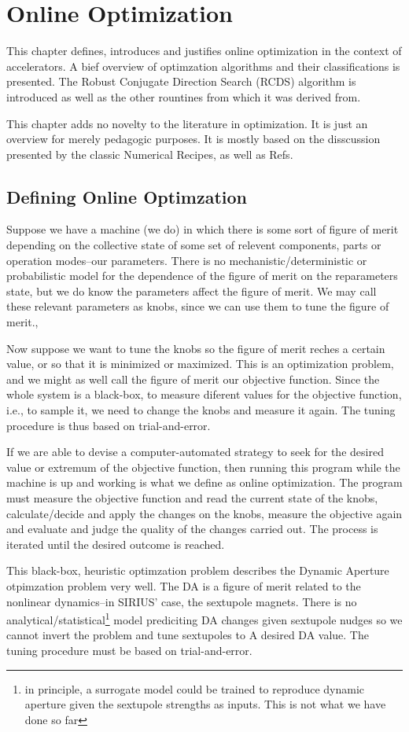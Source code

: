 \chapter{Online Optimization}
This chapter defines, introduces and justifies online optimization in the context of accelerators. A bief overview of optimzation algorithms and their classifications is presented. The Robust Conjugate Direction Search (RCDS) algorithm is introduced as well as the other rountines from which it was derived from.

This chapter adds no novelty to the literature in optimization. It is just an overview for merely pedagogic purposes. It is mostly based on the disscussion presented by the classic Numerical Recipes, as well as Refs.
\section{Defining Online Optimzation}
Suppose we have a machine (we do) in which there is some sort of figure of merit depending on the collective state of some set of relevent components, parts or operation modes--our parameters. There is no mechanistic/deterministic or probabilistic model for the dependence of the figure of merit on the reparameters state, but we do know the parameters affect the figure of merit. We may call these relevant parameters as knobs, since we can use them to tune the figure of merit.,

Now suppose we want to tune the knobs so the figure of merit reches a certain value, or so that it is minimized or maximized. This is an optimization problem, and we might as well call the figure of merit our objective function. Since the whole system is a black-box, to measure diferent values for the objective function, i.e., to sample it, we need to change the knobs and measure it again. The tuning procedure is thus based on trial-and-error.

If we are able to devise a computer-automated strategy to seek for the desired value or extremum of the objective function, then running this program while the machine is up and working is what we define as online optimization. The program must measure the objective function and read the current state of the knobs, calculate/decide and apply the changes on the knobs, measure the objective again and evaluate and judge the quality of the changes carried out. The process is iterated until the desired outcome is reached.

This black-box, heuristic optimzation problem describes the Dynamic Aperture otpimzation problem very well. The DA is a figure of merit related to the nonlinear dynamics--in SIRIUS' case, the sextupole magnets. There is no analytical/statistical\footnote{in principle, a surrogate model could be trained to reproduce dynamic aperture given the sextupole strengths as inputs. This is not what we have done so far} model prediciting DA changes given sextupole nudges so we cannot invert the problem and tune sextupoles to A desired DA value. The tuning procedure must be based on trial-and-error.

